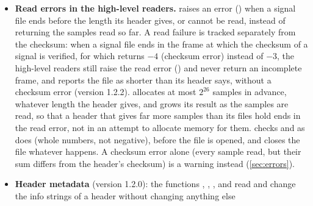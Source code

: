 \begin{itemize}
  written. Both writers then write their files to temporary files in the
  directories of the destinations (), which are
  renamed over the destinations once all of them are complete, and removed
  after a failure, so that a failure never leaves a truncated header, signal
  file or annotation file in place of an existing one. A destination that is
  not a regular file, such as a device, is written directly; for a symbolic
  link, the file it leads to is replaced, and the link is kept. The files
  written are unchanged, byte for byte, and keep the permissions of the files
  they replace. (In legacy mode, an annotation file that must be sorted is
  renamed over its destination before the  program sorts it
  there.) The library functions (, ,
  , \ldots) and the tools keep the behavior of C.
\item \textbf{Read errors in the high-level readers.} 
  raises an error () when a signal file ends before the length its header gives, or cannot
  be read, instead of returning the samples read so far. A read failure is
  tracked separately from the checksum: when a signal file ends in the frame
  at which the checksum of a signal is verified, for which 
  returns $-4$ (checksum error) instead of $-3$, the high-level readers
  still raise the read error () and never return an
  incomplete frame, and  reports the file as shorter
  than its header says, without a checksum error (version 1.2.2).
   allocates at most $2^{26}$
  samples in advance, whatever length the header gives, and grows its
  result as the samples are read, so that a header that gives far more
  samples than its files hold ends in the read error, not in an attempt to
  allocate memory for them.  checks
   and  as  does (whole
  numbers,  not negative), before the file is opened, and
  closes the file whatever happens. A checksum error alone (every sample
  read, but their sum differs from the header's checksum) is a warning
  instead (\cref{sec:errors}).
\item \textbf{Header metadata} (version 1.2.0): the functions
  , , ,
   and  read and change the
   info strings of a header without changing anything else

\end{itemize}
